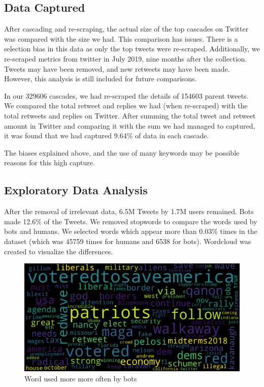 \documentclass[letterpaper]{article}
\begin{document}
\subsection{Data Captured}
After cascading and re-scraping, the actual size of the top cascades on Twitter was compared with the size we had. This comparison has issues. There is a selection bias in this data as only the top tweets were re-scraped. 
Additionally, we re-scraped metrics from twitter in July 2019, nine months after the collection. Tweets may have been removed, and new retweets may have been made.
However, this analysis is still included for future comparisons. \par

In our 329606 cascades, we had re-scraped the details of 154603 parent
tweets. We compared the total retweet and replies we had (when re-scraped) with the total retweets and replies on Twitter. After summing the total tweet and retweet amount in Twitter 
and comparing it with the sum we had managed to captured, it was found that we had captured 9.64\% of data in each cascade. \par

The biases explained
above, and the use of many keywords may be possible reasons for this high capture.

\subsection{Exploratory Data Analysis}
After the removal of irrelevant data, 6.5M Tweets by 1.7M users remained. Bots made 12.6\% of the Tweets. We removed stopwords to compare the words used by bots and humans. 
We selected words which appear more than 0.03\% times in the dataset (which was 45759 times for humans and 6538 for bots). Wordcloud was created to visualize 
the differences.

\begin{figure}[h!]
    \includegraphics[width=\linewidth]{images/mostly_bots.png}
    \caption{Word used more more often by bots}
    \label{fig:bots_dominant}
\end{figure}
\end{document}
